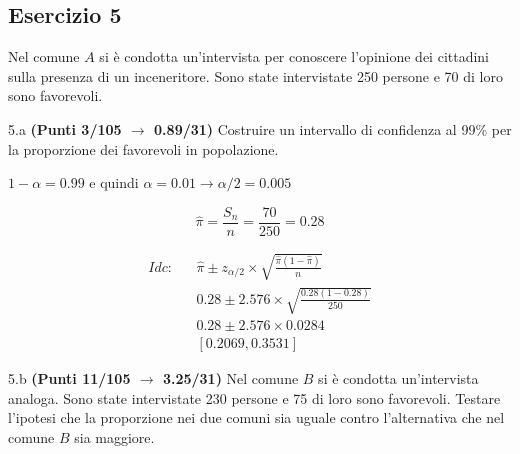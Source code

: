 \documentclass[
  11pt,
]{book}
\theoremstyle{mytheoremstyle}
\theoremstyle{mydefstyle}
\newenvironment{sol}
  {
  \begin{tcolorbox}[enhanced,breakable,arc=0.1mm,boxrule=1pt,colback=white,colframe=iblue,
  title=\bf \fontfamily{lmss}\selectfont \hspace{.5 cm} Soluzione,drop fuzzy shadow]

}{
\end{tcolorbox}
  }
\begin{document}
\subsection{Esercizio 5}\label{esercizio-5-26}

Nel comune \(A\) si è condotta un'intervista per conoscere l'opinione
dei cittadini sulla presenza di un inceneritore. Sono state intervistate
250 persone e 70 di loro sono favorevoli.

5.a \textbf{(Punti 3/105 \(\rightarrow\) 0.89/31)} Costruire un intervallo di confidenza al 99\%
per la proporzione dei favorevoli in popolazione.

\begin{sol}
\(1-\alpha =0.99\) e quindi \(\alpha=0.01\rightarrow \alpha/2=0.005\)

\[
  \hat\pi = \frac{S_n}n = \frac{ 70 }{ 250 }= 0.28 
\]

\begin{eqnarray*}
  Idc: & &  \hat\pi \pm  z_{\alpha/2} \times \sqrt{\frac{\hat\pi(1-\hat\pi)}{n}} \\
     & &  0.28 \pm  2.576 \times \sqrt{\frac{ 0.28 (1- 0.28 )}{ 250 }} \\
     & &  0.28 \pm  2.576 \times  0.0284 \\
     & & [ 0.2069 ,  0.3531 ]
\end{eqnarray*}

\end{sol}

5.b \textbf{(Punti 11/105 \(\rightarrow\) 3.25/31)} Nel comune \(B\) si è condotta un'intervista analoga.
Sono state intervistate 230 persone e 75 di loro sono favorevoli. Testare
l'ipotesi che la proporzione nei due comuni sia uguale contro l'alternativa che nel
comune \(B\) sia maggiore.
\end{document}
